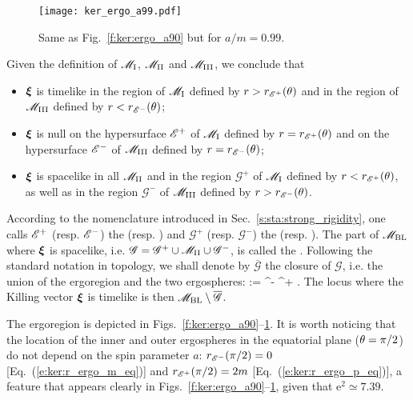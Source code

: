 \begin{figure}
\centerline{\texttt{[image: ker\_ergo\_a99.pdf]}}
\caption[]{\label{f:ker:ergo_a99} \footnotesize
Same as Fig.~\ref{f:ker:ergo_a90} but for $a/m=0.99$.
}
\end{figure}

Given the definition of $\mathscr{M}_{\rm I}$, $\mathscr{M}_{\rm II}$ and $\mathscr{M}_{\rm III}$, we conclude that
\begin{itemize}
\item $\bm{\xi}$ is timelike in the region of $\mathscr{M}_{\rm I}$ defined by $r>r_{\mathscr{E}^+}(\theta)$
and in the region of $\mathscr{M}_{\rm III}$ defined by $r<r_{\mathscr{E}^-}(\theta)$;
\item $\bm{\xi}$ is null on the hypersurface $\mathscr{E}^+$ of $\mathscr{M}_{\rm I}$ defined by
$r=r_{\mathscr{E}^+}(\theta)$
and on the hypersurface $\mathscr{E}^-$ of $\mathscr{M}_{\rm III}$ defined by $r=r_{\mathscr{E}^-}(\theta)$;
\item $\bm{\xi}$ is spacelike in all $\mathscr{M}_{\rm II}$ and in the region
$\mathscr{G}^+$ of $\mathscr{M}_{\rm I}$
defined by $r<r_{\mathscr{E}^+}(\theta)$, as well as
in the region $\mathscr{G}^-$ of $\mathscr{M}_{\rm III}$ defined by $r>r_{\mathscr{E}^-}(\theta)$.
\end{itemize}
According to the nomenclature introduced in Sec.~\ref{s:sta:strong_rigidity},
one calls $\mathscr{E}^+$ (resp. $\mathscr{E}^-$) the
(resp. )
and $\mathscr{G}^+$ (resp. $\mathscr{G}^-$) the
(resp. ).
The part of $\mathscr{M}_{\rm BL}$ where $\bm{\xi}$ is spacelike, i.e.
$\mathscr{G} = \mathscr{G}^+ \cup \mathscr{M}_{\rm II} \cup \mathscr{G}^-$,
is called the .
Following the standard notation in topology, we shall denote
by $\overline{\mathscr{G}}$ the closure of $\mathscr{G}$, i.e. the
union of the ergoregion and the two ergospheres:
\be
     :=  \cup \E^- \cup \E^+ .
\ee
The locus where the Killing vector $\bm{\xi}$ is timelike is then
$\mathscr{M}_{\rm BL}\setminus \overline{\mathscr{G}}$.

The ergoregion is depicted in Figs.~\ref{f:ker:ergo_a90}--\ref{f:ker:ergo_a99}.
It is worth noticing that
the location of the inner and outer ergospheres in the equatorial
plane ($\theta=\pi/2$) do not depend on the spin parameter $a$:
$r_{\mathscr{E}^-}(\pi/2) = 0$ [Eq.~(\ref{e:ker:r_ergo_m_eq})] and
$r_{\mathscr{E}^+}(\pi/2) = 2m$ [Eq.~(\ref{e:ker:r_ergo_p_eq})], a feature
that appears clearly in Figs.~\ref{f:ker:ergo_a90}--\ref{f:ker:ergo_a99},
given that $\mathrm{e}^2 \simeq 7.39$.

